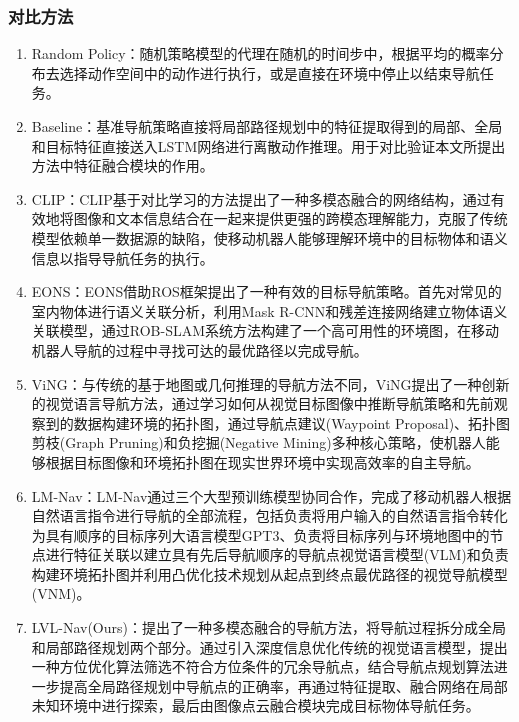 \subsubsection{对比方法}
\begin{enumerate}[topsep = 0 pt, itemsep= 0 pt, parsep=0pt, partopsep=0pt, leftmargin=44pt, itemindent=0pt, labelsep=6pt, label=(\arabic*)]
    \item 	Random Policy：随机策略模型的代理在随机的时间步中，根据平均的概率分布去选择动作空间中的动作进行执行，或是直接在环境中停止以结束导航任务。
    \item	Baseline：基准导航策略直接将局部路径规划中的特征提取得到的局部、全局和目标特征直接送入LSTM网络进行离散动作推理。用于对比验证本文所提出方法中特征融合模块的作用。
    \item   CLIP\cite{radford2021learning}：CLIP基于对比学习的方法提出了一种多模态融合的网络结构，通过有效地将图像和文本信息结合在一起来提供更强的跨模态理解能力，克服了传统模型依赖单一数据源的缺陷，使移动机器人能够理解环境中的目标物体和语义信息以指导导航任务的执行。
    \item   EONS\cite{electronics11071136}：EONS借助ROS框架提出了一种有效的目标导航策略。首先对常见的室内物体进行语义关联分析，利用Mask R-CNN和残差连接网络建立物体语义关联模型，通过ROB-SLAM系统方法构建了一个高可用性的环境图，在移动机器人导航的过程中寻找可达的最优路径以完成导航。
    \item	ViNG\cite{shah2021ving}：与传统的基于地图或几何推理的导航方法不同，ViNG提出了一种创新的视觉语言导航方法，通过学习如何从视觉目标图像中推断导航策略和先前观察到的数据构建环境的拓扑图，通过导航点建议(Waypoint Proposal)、拓扑图剪枝(Graph Pruning)和负挖掘(Negative Mining)多种核心策略，使机器人能够根据目标图像和环境拓扑图在现实世界环境中实现高效率的自主导航。
    \item	LM-Nav\cite{shah2023lm}：LM-Nav通过三个大型预训练模型协同合作，完成了移动机器人根据自然语言指令进行导航的全部流程，包括负责将用户输入的自然语言指令转化为具有顺序的目标序列大语言模型GPT3、负责将目标序列与环境地图中的节点进行特征关联以建立具有先后导航顺序的导航点视觉语言模型(VLM)和负责构建环境拓扑图并利用凸优化技术规划从起点到终点最优路径的视觉导航模型(VNM)。
    \item	LVL-Nav(Ours)：提出了一种多模态融合的导航方法，将导航过程拆分成全局和局部路径规划两个部分。通过引入深度信息优化传统的视觉语言模型，提出一种方位优化算法筛选不符合方位条件的冗余导航点，结合导航点规划算法进一步提高全局路径规划中导航点的正确率，再通过特征提取、融合网络在局部未知环境中进行探索，最后由图像点云融合模块完成目标物体导航任务。
	
\end{enumerate}

